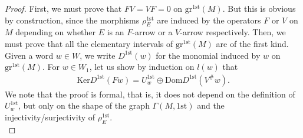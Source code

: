 \documentclass[12pt]{amsart}
\theoremstyle{definition}
\newcommand{\<}{\langle}   %
\renewcommand{\>}{\rangle} %
\begin{document}
\begin{proof}
    First, we must prove that $FV = VF = 0$ on $\mathrm{gr}^{1\mathrm{st}}(M)$. But this is obvious by construction, since the morphisms $\rho_{E}^{1\mathrm{st}}$ are induced by the operators $F$ or $V$ on $M$ depending on whether $E$ is an $F$-arrow or a $V$-arrow respectively. Then, we must prove that all the elementary intervals of $\mathrm{gr}^{1\mathrm{st}}(M)$ are of the first kind. Given a word $w \in W$, we write $D^{1\mathrm{st}}(w)$ for the monomial induced by $w$ on $\mathrm{gr}^{1\mathrm{st}}(M)$. For $w \in W_1$, let us show by induction on $l(w)$ that 
    \begin{align}\label{ElementaryIntervalsFirstKind}
          \mathrm{Ker}D^{1\mathrm{st}}(Fw) =  U^{1\mathrm{st}}_{w} \oplus \mathrm{Dom} D^{1\mathrm{st}}(V^{\#}w).
    \end{align}
    We note that the proof is formal, that is, it does not depend on the definition of $U^{1\mathrm{st}}_w$, but only on the shape of the graph $\Gamma(M,1\mathrm{st})$ and the injectivity/surjectivity of $\rho^{1\mathrm{st}}_E$. \\


\end{proof}
\end{document}
